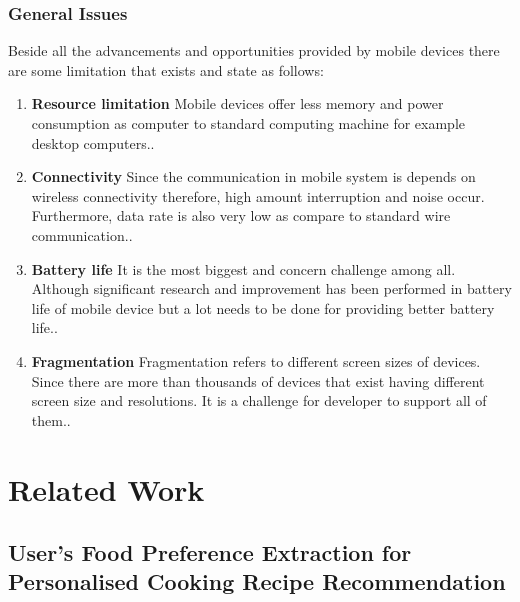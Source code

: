 \subsubsection{General Issues}

Beside all the advancements and opportunities provided by mobile devices there are some limitation that exists and state as follows:

\begin{enumerate}
	
	\item \textbf{Resource limitation}\newline 
	Mobile devices offer less memory and power consumption as computer to standard computing machine for example desktop computers.\cite{ricci2010mobile}. 
	
	\item \textbf{Connectivity}\newline 
	Since the communication in mobile system is depends on wireless connectivity therefore, high amount interruption and noise occur. Furthermore,  data rate is also very low as compare to standard wire communication.\cite{ricci2010mobile}.
	
	\item \textbf{Battery life}\newline
	It is the most biggest and concern challenge among all. Although significant research and improvement has been performed in battery life of mobile device but a lot needs to be done for providing better battery life.\cite{ricci2010mobile}.
	
	\item \textbf{Fragmentation}\newline 
		Fragmentation refers to different screen sizes of devices. Since there are more than thousands of devices that exist having different screen size and resolutions. It is a challenge for developer to support all of them.\cite{ricci2010mobile}.
\end{enumerate}

\section{Related Work}

\subsection{User's Food Preference Extraction for Personalised Cooking Recipe Recommendation}

